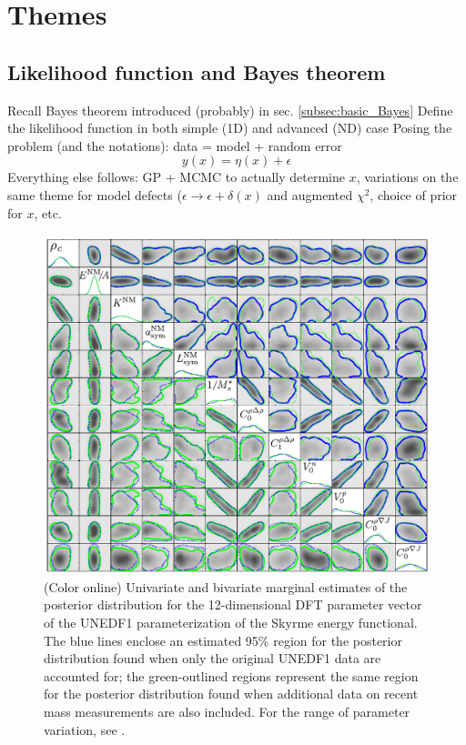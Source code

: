 \section{Themes}  \label{sec:themes}


%
%
%
\subsection{Likelihood function and Bayes theorem}  \label{subsec:L}

\bi
  \I Recall Bayes theorem introduced (probably) in sec. \ref{subsec:basic_Bayes}
  \I Define the likelihood function in both simple (1D) and advanced (ND) case
  \I Posing the problem (and the notations): data = model + random error
  $$ y(x) = \eta(x) + \epsilon  $$
  \I Everything else follows: GP + MCMC to actually determine $x$, variations on 
     the same theme for model defects ($\epsilon \rightarrow \epsilon + \delta(x)$ 
     and augmented $\chi^2$, choice of prior for $x$, etc.
\ei

\begin{figure}[h]
\begin{center}
\includegraphics[width=0.6\columnwidth]{figures/UNEDF1_posterior}
\caption{(Color online) Univariate and bivariate marginal estimates of the 
posterior distribution for the 12-dimensional DFT parameter vector of the 
UNEDF1 parameterization of the Skyrme energy functional. The blue lines enclose 
an estimated 95\% region for the posterior distribution found when only the 
original UNEDF1 data are accounted for; the green-outlined regions represent 
the same region for the posterior distribution found when additional data on 
recent mass measurements are also included. For the range of parameter variation, 
see \cite{mcdonnell2015}.
}
\label{fig:UNEDF1_posterior}
\end{center}
\end{figure}

